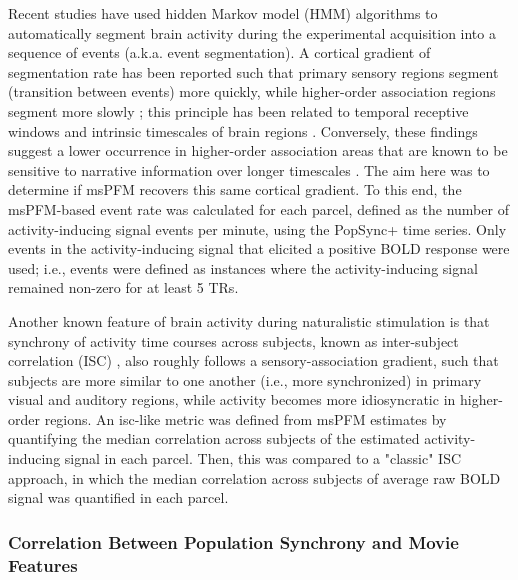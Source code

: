 Recent studies have used hidden Markov model (HMM) algorithms to automatically
segment brain activity during the experimental acquisition into a sequence of
events (a.k.a. event segmentation). A cortical gradient of segmentation rate has
been reported such that primary sensory regions segment (transition between
events) more quickly, while higher-order association regions segment more slowly
\citep{Baldassano2017DiscoveringEventStructure,
Geerligs2022partiallynestedcortical}; this principle has been related to
temporal receptive windows and intrinsic timescales of brain regions
\citep{Murray2014hierarchyintrinsictimescales,Hasson2008HierarchyTemporalReceptive}.
Conversely, these findings suggest a lower occurrence in higher-order
association areas that are known to be sensitive to narrative information over
longer timescales \citep{Lerner2011TopographicMappingHierarchy,
Honey2012SlowCorticalDynamics}. The aim here was to determine if msPFM recovers
this same cortical gradient. To this end, the msPFM-based event rate was
calculated for each parcel, defined as the number of activity-inducing signal
events per minute, using the PopSync+ time series. Only events in the
activity-inducing signal that elicited a positive BOLD response were used; i.e.,
events were defined as instances where the activity-inducing signal remained
non-zero for at least 5 TRs.

Another known feature of brain activity during naturalistic stimulation is that
synchrony of activity time courses across subjects, known as inter-subject
correlation (ISC) \citep{Hasson2004IntersubjectSynchronizationCortical,
Nastase2019Measuringsharedresponses, Finn2020Idiosynchronysharedresponses}, also
roughly follows a sensory-association gradient, such that subjects are more
similar to one another (i.e., more synchronized) in primary visual and auditory
regions, while activity becomes more idiosyncratic in higher-order regions. An
\acrshort*{isc}-like metric was defined from msPFM estimates by quantifying the
median correlation across subjects of the estimated activity-inducing signal in
each parcel. Then, this was compared to a "classic" ISC approach, in which the
median correlation across subjects of average raw BOLD signal was quantified in
each parcel.

\subsubsection*{Correlation Between Population Synchrony and Movie Features}


